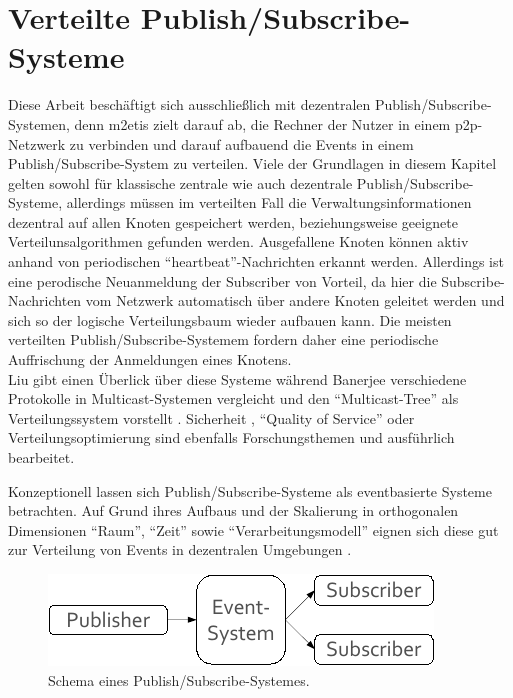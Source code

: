 \section{Verteilte Publish/Subscribe-Systeme}
\label{chap:grundlagen:pubsub}
Diese Arbeit beschäftigt sich ausschließlich mit dezentralen Publish/Subscribe-Sys\-temen, denn \ac{m2etis} zielt darauf ab, die Rechner der Nutzer in einem p2p-Netzwerk zu verbinden und darauf aufbauend die Events in einem Publish/Subscribe-System zu verteilen. Viele der Grundlagen in diesem Kapitel gelten sowohl für klassische zentrale wie auch dezentrale Publish/Subscribe-Systeme, allerdings müssen im verteilten Fall die Verwaltungsinformationen dezentral auf allen Knoten gespeichert werden, beziehungsweise geeignete Verteilunsalgorithmen gefunden werden. Ausgefallene Knoten können aktiv anhand von periodischen ``heartbeat''-Nachrichten erkannt werden. Allerdings ist eine perodische Neuanmeldung der Subscriber von Vorteil, da hier die Subscribe-Nachrichten vom Netzwerk automatisch über andere Knoten geleitet werden und sich so der logische Verteilungsbaum wieder aufbauen kann. Die meisten verteilten Publish/Subscribe-Systemem fordern daher eine periodische Auffrischung der Anmeldungen eines Knotens.\\
Liu gibt einen Überlick über diese Systeme \cite{Liu2003Survey} während Banerjee verschiedene Protokolle in Multicast-Systemen vergleicht und den ``Multicast-Tree'' als Verteilungssystem vorstellt \cite{Banerjee2001Comparative}. Sicherheit \cite{FiegeSecurity}, ``Quality of Service'' \cite{BeFiMu2006PubSubQoS} oder Verteilungsoptimierung \cite{Muhl2002LargeScale} sind ebenfalls Forschungsthemen und ausführlich bearbeitet.

Konzeptionell lassen sich Publish/Subscribe-Systeme als eventbasierte Systeme betrachten. Auf Grund ihres Aufbaus und der Skalierung  in orthogonalen Dimensionen ``Raum'', ``Zeit'' sowie ``Verarbeitungsmodell'' eignen sich diese gut zur Verteilung von Events in dezentralen Umgebungen \cite{PatrickTh2003Many, Cugola2002Using}.

\begin{figure}[htbp]
\centering
\includegraphics{grafics/pubsub_black_box.pdf}
\caption{Schema eines Publish/Subscribe-Systemes.}
\label{fig:pubsub_black_box}
\end{figure}

